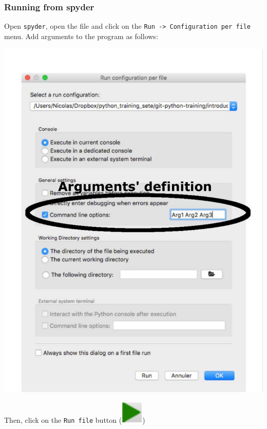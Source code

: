 \begin{frame}[fragile]
    \frametitle{Running from spyder}
    Open \verb+spyder+, open the file and click on the \scriptsize \verb+Run -> Configuration per file+ \normalsize menu. Add arguments to the program as follows:\\
    \vspace{-0.5em}
    \begin{center}
    \includegraphics[scale=0.35, trim={0cm 0cm 0cm 0cm}, clip=true]{figs/args_spyder.pdf}
    \end{center}
    Then, click on the \verb+Run file+ button (\includegraphics[scale=0.5]{figs/run_file.pdf})
\end{frame}
